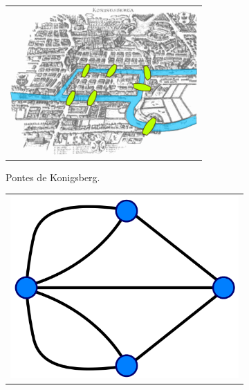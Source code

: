 \begin{easylist}
  
\begin{figure}[!h]
  \begin{subfigure}{.5\textwidth}
    \centering
    \begin{tabular}{c}
      \includegraphics[width=1\textwidth]{images/02/Konigsberg_bridges.png}
    \end{tabular}
    \caption{\label{fig:kon:bridges} Pontes de Konigsberg.}
  \end{subfigure}
  \begin{subfigure}{.5\textwidth}
    \centering
    \begin{tabular}{c}
      \includegraphics[width=1\textwidth]{images/02/Konigsberg_graph_svg.png}

\end{tabular}
\end{subfigure}
\end{figure}
\end{easylist}
